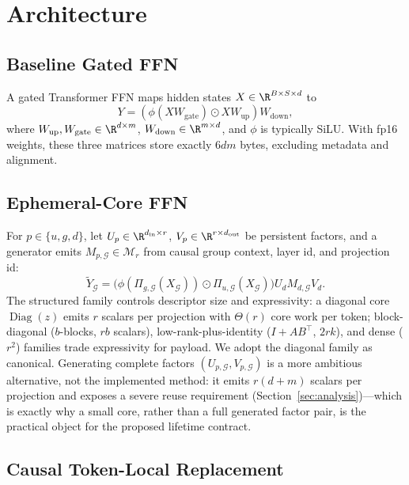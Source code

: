 \section{Architecture}

\subsection{Baseline Gated FFN}

A gated Transformer FFN \cite{shazeer2020gptj} maps hidden states
$X\in\R^{B\times S\times d}$ to
\begin{equation}
Y = \left(\phi(XW_{\mathrm{gate}})\odot XW_{\mathrm{up}}\right)W_{\mathrm{down}},
\end{equation}
where $W_{\mathrm{up}}, W_{\mathrm{gate}}\in\R^{d\times m}$,
$W_{\mathrm{down}}\in\R^{m\times d}$, and $\phi$ is typically SiLU. With fp16
weights, these three matrices store exactly $6dm$ bytes, excluding metadata and
alignment.

\subsection{Ephemeral-Core FFN}

For $p\in\{u,g,d\}$, let $U_p\in\R^{d_{\rm in}\times r}$,
$V_p\in\R^{r\times d_{\rm out}}$ be persistent factors, and a generator
emits $M_{p,\mathcal G}\in\mathcal M_r$ from causal group context, layer id,
and projection id:
\begin{equation}
\widetilde Y_{\mathcal G}=
\bigl(\phi(\Pi_{g,\mathcal G}(X_{\mathcal G}))\odot
\Pi_{u,\mathcal G}(X_{\mathcal G})\bigr)
U_dM_{d,\mathcal G}V_d.
\label{eq:core-ffn}
\end{equation}
The structured family controls descriptor size and expressivity: a diagonal
core $\operatorname{Diag}(z)$ emits $r$ scalars per projection with
$\Theta(r)$ core work per token; block-diagonal ($b$-blocks, $rb$ scalars),
low-rank-plus-identity ($I+AB^\top$, $2rk$), and dense ($r^2$) families trade
expressivity for payload. We adopt the diagonal family as canonical.
Generating complete factors $(U_{p,\mathcal G},V_{p,\mathcal G})$ is a more
ambitious alternative, not the implemented method: it emits $r(d+m)$ scalars
per projection and exposes a severe reuse requirement
(Section~\ref{sec:analysis})---which is exactly why a small core, rather
than a full generated factor pair, is the practical object for the proposed
lifetime contract.

\subsection{Causal Token-Local Replacement}
\label{sec:causal-token}

